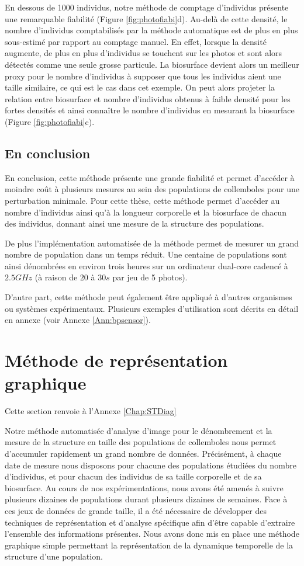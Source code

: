 En dessous de 1000 individus, notre méthode de comptage d'individus présente une
remarquable fiabilité (Figure \ref{fig:photofiabi}d). Au-delà de cette densité,
le nombre d'individus comptabilisés par la méthode automatique est de plus en
plus sous-estimé par rapport au comptage manuel. En effet, lorsque la densité
augmente, de plus en plus d'individus se touchent sur les photos et sont alors
détectés comme une seule grosse particule. La biosurface devient alors un
meilleur proxy pour le nombre d'individus à supposer que tous les individus
aient une taille similaire, ce qui est le cas dans cet exemple. On peut alors projeter
la relation entre biosurface et nombre d'individus obtenus à faible densité pour
les fortes densités et ainsi connaître le nombre d'individus en mesurant la
biosurface (Figure \ref{fig:photofiabi}c).

\subsection{En conclusion}

En conclusion, cette méthode présente une grande fiabilité et permet d'accéder à
moindre coût à plusieurs mesures au sein des populations de collemboles pour une
perturbation minimale. Pour cette thèse, cette méthode permet d'accéder au
nombre d'individus ainsi qu'à la longueur corporelle et la biosurface de chacun
des individus, donnant ainsi une mesure de la structure des populations. 

De plus l'implémentation automatisée de la méthode permet de mesurer un grand
nombre de population dans un temps réduit. Une centaine de populations sont
ainsi dénombrées en environ trois heures sur un ordinateur dual-core cadencé à
$2.5GHz$ (à raison de $20$ à $30s$ par jeu de 5 photos).

D'autre part, cette méthode peut également être appliqué à d'autres organismes
ou systèmes expérimentaux. Plusieurs exemples d'utilisation sont décrits en
détail en annexe (voir Annexe \ref{Ann:bpsensor}).

\section{Méthode de représentation graphique}\label{sec:stdiag}

Cette section renvoie à l'Annexe \ref{Chap:STDiag}

Notre méthode automatisée d'analyse d'image pour le dénombrement et la mesure de
la structure en taille des populations de collemboles nous permet d'accumuler
rapidement un grand nombre de données. Précisément, à chaque date de mesure nous
disposons pour chacune des populations étudiées du nombre d'individus, et pour
chacun des individus de sa taille corporelle et de sa biosurface. Au cours
de nos expérimentations, nous avons été amenés à suivre plusieurs dizaines de
populations durant plusieurs dizaines de semaines. Face à ces jeux de données de
grande taille, il a été nécessaire de développer des techniques de
représentation et d'analyse spécifique afin d'être capable d'extraire l'ensemble
des informations présentes. Nous avons donc mis en place une méthode graphique
simple permettant la représentation de la dynamique temporelle de la structure
d'une population. 

